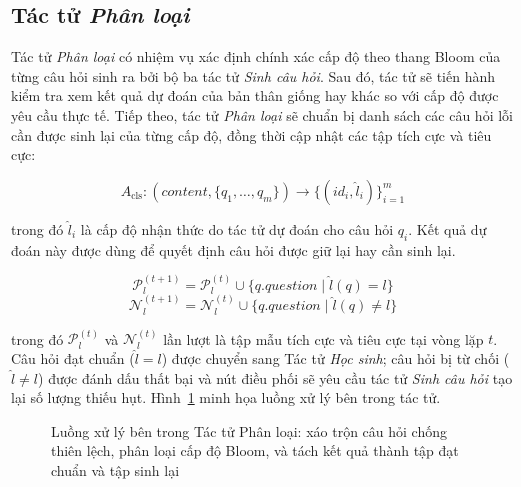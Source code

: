 \subsection{Tác tử \textit{Phân loại}}

Tác tử \textit{Phân loại} có nhiệm vụ xác định chính xác cấp độ theo thang Bloom \cite{bloom1956taxonomy} của từng câu hỏi sinh ra bởi bộ ba tác tử \textit{Sinh câu hỏi}. Sau đó, tác tử sẽ tiến hành kiểm tra xem kết quả dự đoán của bản thân giống hay khác so với cấp độ được yêu cầu thực tế. Tiếp theo, tác tử \textit{Phân loại} sẽ chuẩn bị danh sách các câu hỏi lỗi cần được sinh lại của từng cấp độ, đồng thời cập nhật các tập tích cực và tiêu cực:

\begin{equation}
A_{\text{cls}}: (\textit{content}, \{q_1, \ldots, q_m\}) \longrightarrow \{(\textit{id}_i, \hat{l}_i)\}_{i=1}^{m}
\end{equation}

\noindent trong đó $\hat{l}_i$ là cấp độ nhận thức do tác tử dự đoán cho câu hỏi $q_i$. Kết quả dự đoán này được dùng để quyết định câu hỏi được giữ lại hay cần sinh lại.

\begin{equation}
\mathcal{P}_l^{(t+1)} = \mathcal{P}_l^{(t)} \cup \{q.\textit{question} \mid \hat{l}(q) = l\}
\end{equation}
\begin{equation}
\mathcal{N}_l^{(t+1)} = \mathcal{N}_l^{(t)} \cup \{q.\textit{question} \mid \hat{l}(q) \neq l\}
\end{equation}

\noindent trong đó $\mathcal{P}_l^{(t)}$ và $\mathcal{N}_l^{(t)}$ lần lượt là tập mẫu tích cực và tiêu cực tại vòng lặp $t$. Câu hỏi đạt chuẩn ($\hat{l} = l$) được chuyển sang Tác tử \textit{Học sinh}; câu hỏi bị từ chối ($\hat{l} \neq l$) được đánh dấu thất bại và nút điều phối sẽ yêu cầu tác tử \textit{Sinh câu hỏi} tạo lại số lượng thiếu hụt. Hình~\ref{fig:agent-classifier} minh họa luồng xử lý bên trong tác tử.

\begin{figure}[htbp]
    \centering
    \resizebox{0.9\textwidth}{!}{}
    \caption{Luồng xử lý bên trong Tác tử Phân loại: xáo trộn câu hỏi chống thiên lệch, phân loại cấp độ Bloom, và tách kết quả thành tập đạt chuẩn và tập sinh lại}
    \label{fig:agent-classifier}
\end{figure}

